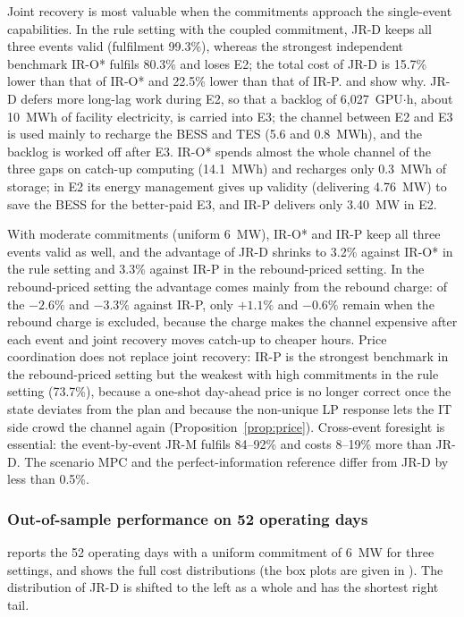 Joint recovery is most valuable when the commitments approach the single-event capabilities. In the rule setting with
the coupled commitment, JR-D keeps all three events valid (fulfilment 99.3\%), whereas the strongest independent
benchmark IR-O* fulfils 80.3\% and loses E2; the total cost of JR-D is 15.7\% lower than that of IR-O* and 22.5\% lower
than that of IR-P.  and  show why. JR-D defers more long-lag work during E2, so
that a backlog of 6,027~GPU$\cdot$h, about 10~MWh of facility electricity, is carried into E3; the channel between E2
and E3 is used mainly to recharge the BESS and TES (5.6 and 0.8~MWh), and the backlog is worked off after E3. IR-O*
spends almost the whole channel of the three gaps on catch-up computing (14.1~MWh) and recharges only 0.3~MWh of
storage; in E2 its energy management gives up validity (delivering 4.76~MW) to save the BESS for the better-paid E3,
and IR-P delivers only 3.40~MW in E2.

With moderate commitments (uniform 6~MW), IR-O* and IR-P keep all three events valid as well, and the advantage of JR-D
shrinks to 3.2\% against IR-O* in the rule setting and 3.3\% against IR-P in the rebound-priced setting. In the rebound-priced setting the
advantage comes mainly from the rebound charge: of the $-2.6\%$ and $-3.3\%$ against IR-P, only $+1.1\%$ and $-0.6\%$
remain when the rebound charge is excluded, because the charge makes the channel expensive after each event and joint
recovery moves catch-up to cheaper hours. Price coordination does not replace joint recovery: IR-P is the strongest
benchmark in the rebound-priced setting but the weakest with high commitments in the rule setting (73.7\%), because a
one-shot day-ahead price is no longer correct once the state deviates from the plan and because the non-unique LP
response lets the IT side crowd the channel again (Proposition~\ref{prop:price}). Cross-event foresight is essential:
the event-by-event JR-M fulfils 84--92\% and costs 8--19\% more than JR-D. The scenario MPC and the perfect-information
reference differ from JR-D by less than 0.5\%.

\subsubsection{Out-of-sample performance on 52 operating days}
\label{sec:res-mc}

 reports the 52 operating days with a uniform commitment of 6~MW for three settings, and
 shows the full cost distributions (the box plots are given in ). The distribution
of JR-D is shifted to the left as a whole and has the shortest right tail.


